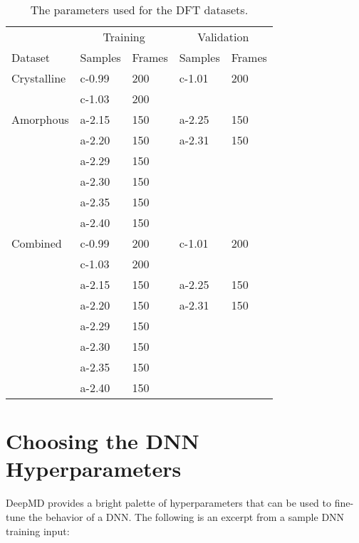 \begin{table}
  \begin{tabularx}{\textwidth}{lllll}
    \toprule
    \multicolumn{1}{c}{} & \multicolumn{2}{c}{Training} & \multicolumn{2}{c}{Validation} \\
    Dataset & Samples & Frames & Samples & Frames \\
    \midrule
    Crystalline & c-0.99 & 200 & c-1.01 & 200 \\
     & c-1.03 & 200 & & \\
    \midrule
    Amorphous & a-2.15 & 150 & a-2.25 & 150 \\
     & a-2.20 & 150 & a-2.31 & 150 \\
     & a-2.29 & 150 & & \\
     & a-2.30 & 150 & & \\
     & a-2.35 & 150 & & \\
     & a-2.40 & 150 & & \\
    \midrule
    Combined & c-0.99 & 200 & c-1.01 & 200 \\
     & c-1.03 & 200 & & \\
     & a-2.15 & 150 & a-2.25 & 150 \\
     & a-2.20 & 150 & a-2.31 & 150 \\
     & a-2.29 & 150 & & \\
     & a-2.30 & 150 & & \\
     & a-2.35 & 150 & & \\
     & a-2.40 & 150 & & \\
    \bottomrule
  \end{tabularx}
  \caption{The parameters used for the DFT datasets.}
  \label{tab:datasets}
\end{table}

\section{Choosing the DNN Hyperparameters}

DeepMD provides a bright palette of hyperparameters that can be used to
fine-tune the behavior of a DNN. The following is an excerpt from a sample DNN
training input:

